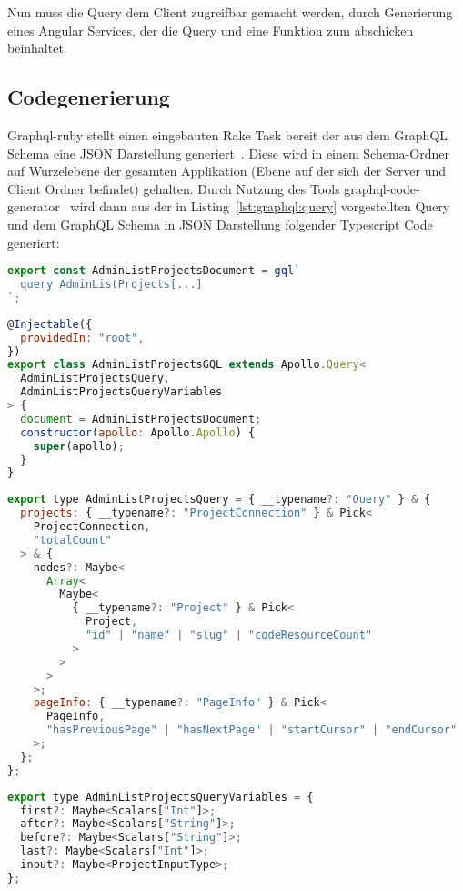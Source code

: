 Nun muss die Query dem Client zugreifbar gemacht werden, durch Generierung eines Angular Services, der die Query und eine Funktion zum abschicken beinhaltet.

\subsection{Codegenerierung}
\label{impl:graphql:generation}
Graphql-ruby stellt einen eingebauten Rake Task bereit der aus dem GraphQL Schema eine JSON Darstellung generiert~\cite{graphql-rake-task}. Diese wird in einem Schema-Ordner auf Wurzelebene der gesamten Applikation (Ebene auf der sich der Server und Client Ordner befindet) gehalten.
Durch Nutzung des Tools graphql-code-generator~\cite{graphql-code-generator} wird dann aus der in Listing~\ref{lst:graphql:query} vorgestellten Query und dem GraphQL Schema in JSON Darstellung folgender Typescript Code generiert:

\begin{lstlisting}[language=JavaScript,float=h!,caption={Generierter Aufruf der gql-Funktion erhält die AdminListProjects Query als String}, label={lst:graphql:gen-gql}]
export const AdminListProjectsDocument = gql`
  query AdminListProjects[...]
`;
\end{lstlisting}

\begin{lstlisting}[language=JavaScript,float=h!,caption={Generierter Service enthält den Aufruf der Query als Instanzvariable}, label={lst:graphql:gen-service}]
@Injectable({
  providedIn: "root",
})
export class AdminListProjectsGQL extends Apollo.Query<
  AdminListProjectsQuery,
  AdminListProjectsQueryVariables
> {
  document = AdminListProjectsDocument;
  constructor(apollo: Apollo.Apollo) {
    super(apollo);
  }
}
\end{lstlisting}

\begin{lstlisting}[language=JavaScript,float=h!,caption={Generierter Antworttyp}, label={lst:graphql:gen-responsetype}]
export type AdminListProjectsQuery = { __typename?: "Query" } & {
  projects: { __typename?: "ProjectConnection" } & Pick<
    ProjectConnection,
    "totalCount"
  > & {
    nodes?: Maybe<
      Array<
        Maybe<
          { __typename?: "Project" } & Pick<
            Project,
            "id" | "name" | "slug" | "codeResourceCount"
          >
        >
      >
    >;
    pageInfo: { __typename?: "PageInfo" } & Pick<
      PageInfo,
      "hasPreviousPage" | "hasNextPage" | "startCursor" | "endCursor"
    >;
  };
};
\end{lstlisting}
\begin{lstlisting}[language=JavaScript,float=h!,caption={Generierter Parametertyp}, label={lst:graphql:gen-variables}]
export type AdminListProjectsQueryVariables = {
  first?: Maybe<Scalars["Int"]>;
  after?: Maybe<Scalars["String"]>;
  before?: Maybe<Scalars["String"]>;
  last?: Maybe<Scalars["Int"]>;
  input?: Maybe<ProjectInputType>;
};
\end{lstlisting}



